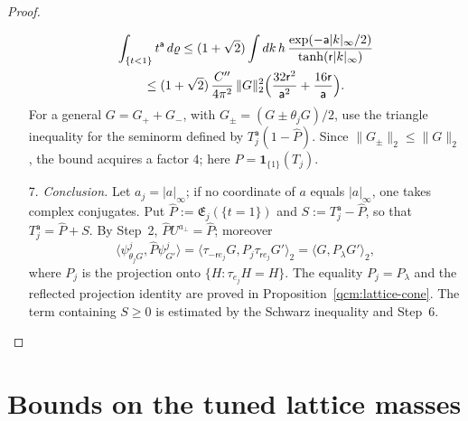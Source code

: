 \documentclass[11pt,letterpaper,reqno]{amsart}
\theoremstyle{definition}
\begin{document}
\begin{proof}
\begin{enumerate}
\begin{multline*}
\int_{\{t<1\}}t^{\mathsf a}\,d\varrho\le(1+\sqrt2)\int dk\,h\,\frac{\exp(-\mathsf a|k|_\infty/2)}{\tanh(\mathsf r|k|_\infty)}\\
\le(1+\sqrt2)\,\frac{C''}{4\pi^2}\,\|G\|_2^2\Bigl(\frac{32\mathsf r^2}{\mathsf a^2}+\frac{16\mathsf r}{\mathsf a}\Bigr).
\end{multline*}
For a general $G=G_++G_-$, with $G_\pm=(G\pm\theta_jG)/2$, use the triangle inequality for the seminorm defined by $T_j^{\mathsf a}(1-\hat P)$. Since $\|G_\pm\|_2\le\|G\|_2$, the bound acquires a factor $4$; here $\hat P=\mathbf1_{\{1\}}(T_j)$.
\item[7.] \emph{Conclusion.}
Let $a_j=|a|_\infty$; if no coordinate of $a$ equals $|a|_\infty$, one takes complex conjugates.
Put $\hat P:=\mathfrak E_j(\{t=1\})$ and $S:=T_j^{\mathsf a}-\hat P$, so that $T_j^{\mathsf a}=\hat P+S$.
By Step~2, $\hat PU^{a_\perp}=\hat P$; moreover
\begin{equation*}
\bigl\langle\psi^j_{\theta_jG},\hat P\psi^j_{G'}\bigr\rangle=\bigl\langle\tau_{-\mathsf re_j}G,P_j\tau_{\mathsf re_j}G'\bigr\rangle_2=\langle G,P_\lambda G'\rangle_2,
\end{equation*}
where $P_j$ is the projection onto $\{H:\tau_{e_j}H=H\}$. The equality $P_j=P_\lambda$ and the reflected projection identity are proved in Proposition~\ref{qcm:lattice-cone}.
The term containing $S\ge0$ is estimated by the Schwarz inequality and Step~6.
\end{enumerate}
\end{proof}


\section{Bounds on the tuned lattice masses}
\end{document}
